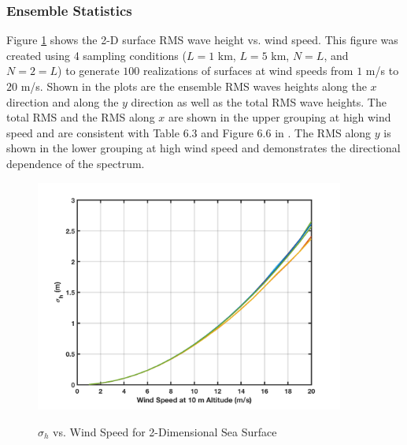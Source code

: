 \subsubsection{Ensemble Statistics}
Figure \ref{os_fig:7ffg} shows the 2-D surface RMS wave height vs. wind speed. This figure was created using 4 sampling conditions ($L = 1 $ km, $L = 5 $ km, $N = L$, and $N = 2=L$) to generate $100$ realizations of surfaces at wind speeds from $1$ m/s to $20$ m/s. Shown in the plots are the ensemble RMS waves heights along the $x$ direction and along the $y$ direction as well as the total RMS wave heights. The total RMS and the RMS along $x$ are shown in the upper grouping at high wind speed and are consistent with Table 6.3 and Figure 6.6 in \cite{temper_guide}. The RMS along $y$ is shown in the lower grouping at high wind speed and demonstrates the directional dependence of the spectrum.
\begin{figure}[H]
  \begin{center}
\includegraphics[width=4in]{../media/Ocean_Surface/2d_ensemble_rms.png}
  \end{center}
  \renewcommand{\baselinestretch}{1} \small\normalsize
  \begin{quote}
    \caption[$\sigma_h$ vs. Wind Speed for 2-Dimensional Sea Surface]{$\sigma_h$ vs. Wind Speed for 2-Dimensional Sea Surface\label{os_fig:7ffg}}
  \end{quote}
\end{figure}
\renewcommand{\baselinestretch}{2} \small\normalsize


